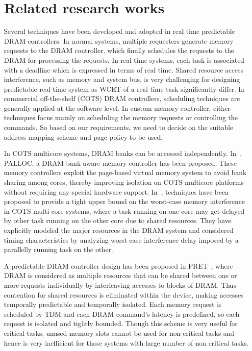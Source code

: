 \chapter{Related research works}\label{ch3}
\noindent
Several techniques have been developed and adopted in real time predictable DRAM controllers. In normal systems, multiple 
requesters generate memory requests to the DRAM controller, which finally schedules the requests to the DRAM for processing 
the requests. In real time systems, each task is associated with a deadline which is expressed in terms of real time. Shared
resource access interference, such as memory and system bus, is very challenging for designing predictable real time system 
as WCET of a real time task significantly differ. In commercial off-the-shelf (COTS) DRAM controllers, scheduling techniques 
are generally applied at the software level. In custom memory controller, either techniques focus mainly on scheduling the 
memory requests or controlling the commands. So based on our requirements, we need to decide on the suitable address mapping 
scheme and page policy to be used.

\noindent
In COTS multicore systems, DRAM banks can be accessed independently. In~\cite{yun2014palloc}, PALLOC, a DRAM bank aware 
memory controller has been proposed. These memory controllers exploit the page-based virtual memory system to avoid bank 
sharing among cores, thereby improving isolation on COTS multicore platforms without requiring any special hardware support. 
In~\cite{kim2014bounding}, techniques have been proposed to provide a tight upper bound on the worst-case memory interference in COTS 
multi-core systems, where a task running on one core may get delayed by other task running on the other core due to shared 
resources. They have explicitly modeled the major resources in the DRAM system and considered timing characteristics by 
analyzing worst-case interference delay imposed by a parallelly running task on the other.

\noindent
A predictable DRAM controller design has been proposed in PRET~\cite{reineke2011pret}, where DRAM is considered as multiple 
resources that can be shared between one or more requests individually by interleaving accesses to blocks of DRAM. Thus 
contention for shared resources is eliminated within the device, making accesses temporally predictable and temporally 
isolated. Each memory request is scheduled by TDM and each DRAM command's latency is predefined, so each request is isolated 
and tightly bounded. Though this scheme is very useful for critical tasks, unused memory slots cannot be used for non critical
tasks and hence is very inefficient for those systems with large number of non critical tasks.

